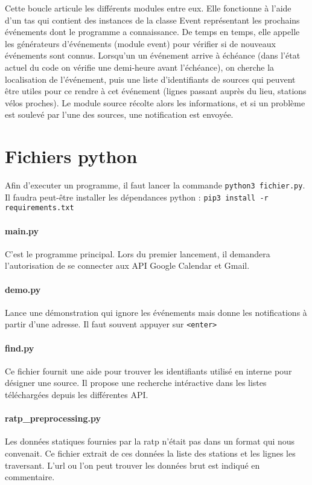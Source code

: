 \documentclass[a4paper, 8pt]{article}
\begin{document}
Cette boucle articule les différents modules entre eux.
Elle fonctionne à l'aide d'un tas qui contient des instances de la classe Event
représentant les prochains événements dont le programme a connaissance.
De temps en temps, elle appelle les générateurs d'événements (module event) pour
vérifier si de nouveaux événements sont connus.
Lorsqu'un un événement arrive à échéance (dans l'état actuel du code on vérifie une
demi-heure avant l'échéance), on cherche la localisation de l'événement, puis
une liste d'identifiants de sources qui peuvent être utiles pour ce rendre à cet
événement (lignes passant auprès du lieu, stations vélos proches).
Le module source récolte alors les informations, et si un problème est soulevé
par l'une des sources, une notification est envoyée.


\section{Fichiers python}

Afin d'executer un programme, il faut lancer la commande
\texttt{python3 fichier.py}.
Il faudra peut-être installer les dépendances python :
\texttt{pip3 install -r requirements.txt}

\paragraph{main.py} C'est le programme principal. Lors du premier lancement,
il demandera l'autorisation de se connecter aux API Google Calendar et Gmail.

\paragraph{demo.py} Lance une démonstration qui ignore les événements mais donne les
notifications à partir d'une adresse. Il faut souvent appuyer sur
\texttt{<enter>}

\paragraph{find.py} Ce fichier fournit une aide
pour trouver les identifiants utilisé en interne pour désigner une source.
Il propose une recherche intéractive dans les listes téléchargées depuis les
différentes API.

\paragraph{ratp\_preprocessing.py} Les données statiques fournies par la ratp
n'était pas dans un format qui nous convenait.
Ce fichier extrait de ces données la liste des stations et les lignes les
traversant. L'url ou l'on peut trouver les données brut est indiqué en
commentaire.
\end{document}
